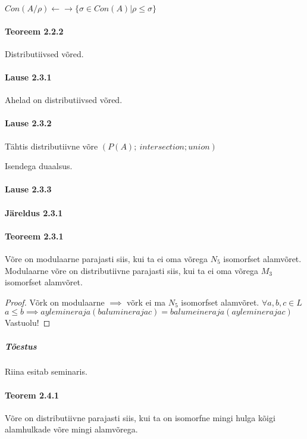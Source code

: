 \documentclass[12pt]{report}
\numberwithin{equation}{section}
\theoremstyle{definition}
\theoremstyle{plain}
\begin{document}
$Con(A/\rho) \leftarrow \rightarrow \{\sigma \in Con(A) | \rho \leq \sigma \}$

\paragraph{Teoreem 2.2.2}

Distributiivsed võred. 

\paragraph{Lause 2.3.1}

Ahelad on distributiivsed võred.

\paragraph{Lause 2.3.2}

Tähtis distributiivne võre $(P(A); \
intersection; union)$

Isendega duaalsus.

\paragraph{Lause 2.3.3}

\paragraph{Järeldus 2.3.1}

\paragraph{Teoreem 2.3.1}

Võre on modulaarne parajasti siis, kui ta ei oma võrega $N_5$ isomorfset alamvõret. Modulaarne võre on distributiivne parajasti siis, kui ta ei oma võrega $M_3$ isomorfset alamvõret.

\begin{proof}
Võrk on modulaarne $ \implies $ võrk ei ma $N_5$ isomorfset alamvõret. 
$\forall a,b,c \in L$
$a \leq b \implies a ylemineraja ( b alumine raja c )= b alumeine raja (a ylemine raja c)$ Vastuolu!


\end{proof}

\subparagraph{Tõestus}

Riina esitab seminaris.

\paragraph{Teorem 2.4.1}
Võre on distributiivne parajasti siis, kui ta on isomorfne mingi hulga kõigi alamhulkade võre mingi alamvõrega. 
\end{document}

